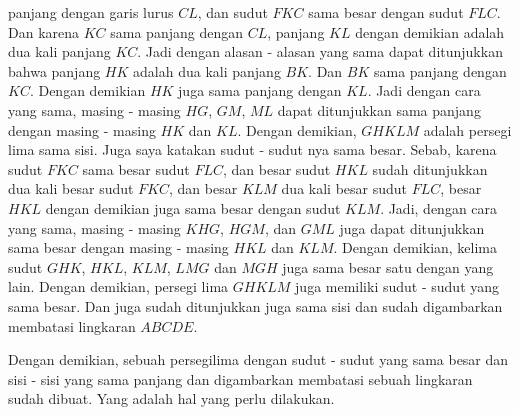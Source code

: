 \documentclass[a4paper]{book}
\begin{document}
panjang dengan garis lurus $CL$, dan sudut $FKC$ sama besar dengan sudut
$FLC$. Dan karena $KC$ sama panjang dengan $CL$, panjang $KL$ dengan 
demikian adalah dua kali panjang $KC$. Jadi dengan alasan - alasan yang 
sama dapat ditunjukkan bahwa panjang $HK$ adalah dua kali panjang $BK$.
Dan $BK$ sama panjang dengan $KC$. Dengan demikian $HK$ juga sama panjang
dengan $KL$. Jadi dengan cara yang sama, masing - masing $HG$, $GM$, $ML$
dapat ditunjukkan sama panjang dengan masing - masing $HK$ dan $KL$. 
Dengan demikian, $GHKLM$ adalah persegi lima sama sisi. Juga saya katakan 
sudut - sudut nya sama besar. Sebab, karena sudut $FKC$ sama 
besar sudut $FLC$, dan besar sudut $HKL$ sudah ditunjukkan dua kali besar 
sudut $FKC$, dan besar $KLM$ dua kali besar sudut $FLC$, besar $HKL$ 
dengan demikian juga sama besar dengan sudut $KLM$. Jadi, dengan cara
yang sama, masing - masing $KHG$, $HGM$, dan $GML$ juga dapat ditunjukkan
sama besar dengan masing - masing $HKL$ dan $KLM$. Dengan demikian, 
kelima sudut $GHK$, $HKL$, $KLM$, $LMG$ dan $MGH$ juga sama besar satu
dengan yang lain. Dengan demikian, persegi lima $GHKLM$ juga memiliki 
sudut - sudut yang sama besar. Dan juga sudah ditunjukkan juga sama sisi
dan sudah digambarkan membatasi lingkaran $ABCDE$.

Dengan demikian, sebuah persegilima dengan sudut - sudut yang sama besar
dan sisi - sisi yang sama panjang dan digambarkan membatasi sebuah 
lingkaran sudah dibuat. Yang adalah hal yang perlu dilakukan.  


\end{document}
